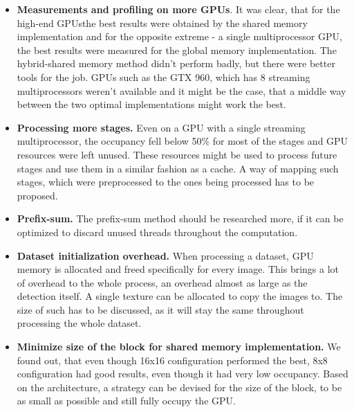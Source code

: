 \begin{itemize}
	\item \textbf{Measurements and profiling on more GPUs}. It was clear, that for the high-end GPUsthe best results were obtained by the shared memory implementation and for the opposite extreme - a single multiprocessor GPU, the best results were measured for the global memory implementation. The hybrid-shared memory method didn't perform badly, but there were better tools for the job. GPUs such as the GTX 960, which has 8 streaming multiprocessors weren't available and it might be the case, that a middle way between the two optimal implementations might work the best.
	\item \textbf{Processing more stages.} Even on a GPU with a single streaming multiprocessor, the occupancy fell below 50\% for most of the stages and GPU resources were left unused. These resources might be used to process future stages and use them in a similar fashion as a cache. A way of mapping such stages, which were preprocessed to the ones being processed has to be proposed.
	\item \textbf{Prefix-sum.} The prefix-sum method should be researched more, if it can be optimized to discard unused threads throughout the computation.
	\item \textbf{Dataset initialization overhead.} When processing a dataset, GPU memory is allocated and freed specifically for every image. This brings a lot of overhead to the whole process, an overhead almost as large as the detection itself. A single texture can be allocated to copy the images to. The size of such has to be discussed, as it will stay the same throughout processing the whole dataset.
	\item \textbf{Minimize size of the block for shared memory implementation.} We found out, that even though 16x16 configuration performed the best, 8x8 configuration had good results, even though it had very low occupancy. Based on the architecture, a strategy can be devised for the size of the block, to be as small as possible and still fully occupy the GPU.
\end{itemize}



\nocite{zemcik-high-performance}
\nocite{herout-realtime-cuda}
\nocite{warps-occupancy}
\nocite{memory-coalescing}
\nocite{gpu-opt-fundamentals}